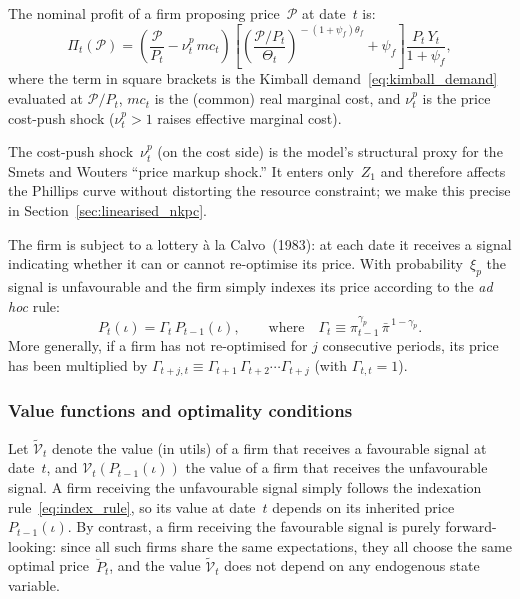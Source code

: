 \documentclass[11pt,a4paper]{article}
\newcommand{\bbar}[1]{\bar{#1}}
\begin{document}
The nominal profit of a firm proposing price~$\mathcal{P}$ at date~$t$
is:
\[
  \Pi_t(\mathcal{P}) =
  \left(\frac{\mathcal{P}}{P_t} - \nu^p_t\,mc_t\right)
  \left[\left(\frac{\mathcal{P}/P_t}{\Theta_t}\right)^{\!-(1+\psi_f)\theta_f}
    + \psi_f\right]
  \frac{P_t\,Y_t}{1+\psi_f},
\]
where the term in square brackets is the Kimball
demand~\eqref{eq:kimball_demand} evaluated at $\mathcal{P}/P_t$,
$mc_t$ is the (common) real marginal cost, and $\nu^p_t$ is the
price cost-push shock ($\nu^p_t > 1$ raises effective marginal cost).

The cost-push shock~$\nu^p_t$ (on the cost side) is the model's
structural proxy for the Smets and Wouters ``price markup shock.''  It
enters only~$Z_1$ and therefore affects the Phillips curve without
distorting the resource constraint; we make this precise in
Section~\ref{sec:linearised_nkpc}.

The firm is subject to a lottery \`a la Calvo~(1983): at each date it
receives a signal indicating whether it can or cannot re-optimise its
price. With probability~$\xi_p$ the signal is unfavourable and the firm
simply indexes its price according to the \emph{ad hoc} rule:
\begin{equation}\label{eq:index_rule}
  P_t(\iota) = \Gamma_t\,P_{t-1}(\iota),
  \qquad\text{where}\quad
  \Gamma_t \equiv \pi_{t-1}^{\gamma_p}\,\bbar\pi^{\,1-\gamma_p}.
\end{equation}
More generally, if a firm has not re-optimised for $j$ consecutive
periods, its price has been multiplied by
$\Gamma_{t+j,t} \equiv \Gamma_{t+1}\,\Gamma_{t+2}\cdots\Gamma_{t+j}$
(with $\Gamma_{t,t}=1$).

\subsubsection{Value functions and optimality conditions}

Let $\widetilde{\mathcal{V}}_t$ denote the value (in utils) of a firm
that receives a favourable signal at date~$t$, and
$\mathcal{V}_t(P_{t-1}(\iota))$ the value of a firm that receives the
unfavourable signal. A firm receiving the unfavourable signal simply
follows the indexation rule~\eqref{eq:index_rule}, so its value at
date~$t$ depends on its inherited price $P_{t-1}(\iota)$. By contrast, a
firm receiving the favourable signal is purely forward-looking: since all
such firms share the same expectations, they all choose the same optimal
price~$\breve P_t$, and the value $\widetilde{\mathcal{V}}_t$ does not
depend on any endogenous state variable.
\end{document}
